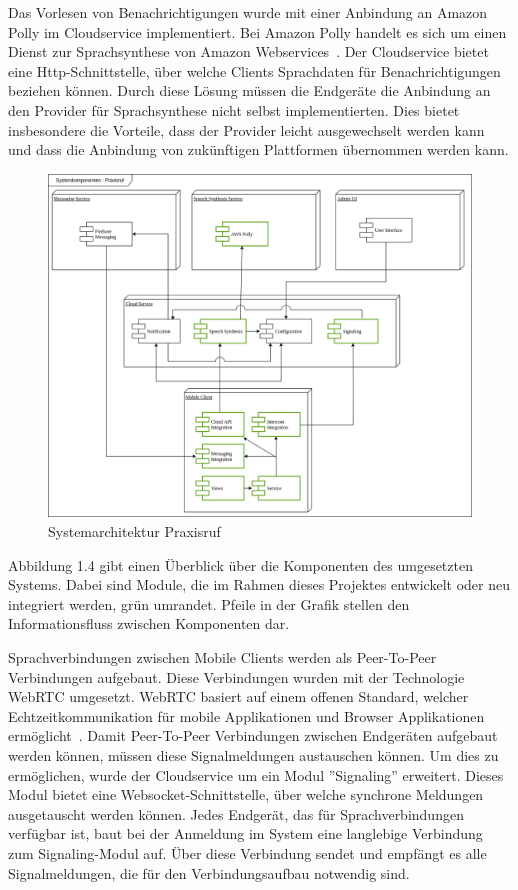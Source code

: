 Das Vorlesen von Benachrichtigungen wurde mit einer Anbindung an Amazon Polly im Cloudservice implementiert.
Bei Amazon Polly handelt es sich um einen Dienst zur Sprachsynthese von Amazon Webservices~\cite{aws_polly}.
Der Cloudservice bietet eine Http-Schnittstelle, über welche Clients Sprachdaten für Benachrichtigungen beziehen können.
Durch diese Lösung müssen die Endgeräte die Anbindung an den Provider für Sprachsynthese nicht selbst implementierten.
Dies bietet insbesondere die Vorteile, dass der Provider leicht ausgewechselt werden kann und dass die Anbindung von zukünftigen Plattformen übernommen werden kann.

\begin{figure}[h]
    \centering
    \begin{minipage}[b]{0.6\textwidth}
        \includegraphics[width=\textwidth]{graphics/diagramms/Component_System_V03}
        \caption{Systemarchitektur Praxisruf}
    \end{minipage}
\end{figure}

Abbildung 1.4 gibt einen Überblick über die Komponenten des umgesetzten Systems.
Dabei sind Module, die im Rahmen dieses Projektes entwickelt oder neu integriert werden, grün umrandet.
Pfeile in der Grafik stellen den Informationsfluss zwischen Komponenten dar.

Sprachverbindungen zwischen Mobile Clients werden als Peer-To-Peer Verbindungen aufgebaut.
Diese Verbindungen wurden mit der Technologie WebRTC umgesetzt.
WebRTC basiert auf einem offenen Standard, welcher Echtzeitkommunikation für mobile Applikationen und Browser Applikationen ermöglicht~\cite{webrtc}.
Damit Peer-To-Peer Verbindungen zwischen Endgeräten aufgebaut werden können, müssen diese Signalmeldungen austauschen können.
Um dies zu ermöglichen, wurde der Cloudservice um ein Modul ''Signaling'' erweitert.
Dieses Modul bietet eine Websocket-Schnittstelle, über welche synchrone Meldungen ausgetauscht werden können.
Jedes Endgerät, das für Sprachverbindungen verfügbar ist, baut bei der Anmeldung im System eine langlebige Verbindung zum Signaling-Modul auf.
Über diese Verbindung sendet und empfängt es alle Signalmeldungen, die für den Verbindungsaufbau notwendig sind.

